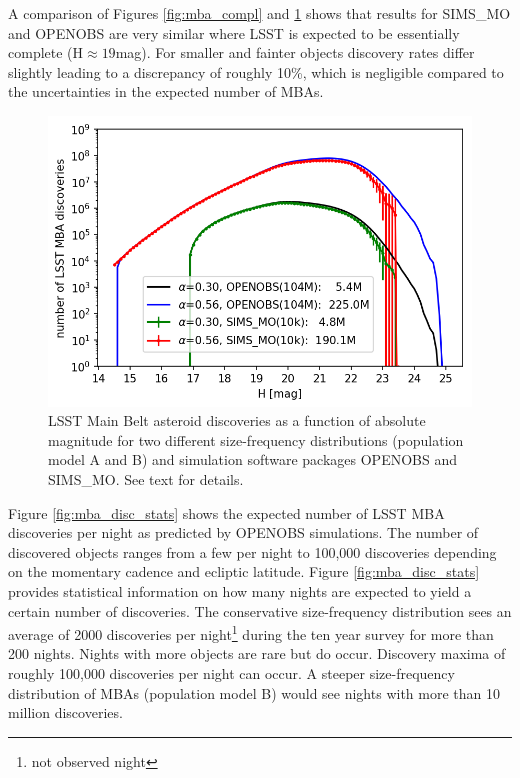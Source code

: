 A comparison of Figures \ref{fig:mba_compl} and \ref{fig:mba_disc} shows that results for SIMS\_MO and OPENOBS are very similar where \gls{LSST} is expected to be essentially complete (H$\approx19$mag). For smaller and fainter objects discovery rates differ slightly leading to a discrepancy of roughly 10\%, which is negligible compared to the uncertainties in the expected number of MBAs. 
%
\begin{figure}[tb!]
\begin{center}
\includegraphics[scale=0.9]{figs/mba_disc3.png}
\end{center}
\caption{LSST Main Belt asteroid discoveries as a function of absolute magnitude for two different size-frequency distributions (population model A and \gls{B}) and simulation software packages OPENOBS and SIMS\_MO. See text for details.}
\label{fig:mba_disc}       %
\end{figure}
%
Figure \ref{fig:mba_disc_stats} shows the expected number of \gls{LSST} \gls{MBA} discoveries per night as predicted by OPENOBS simulations. The number of discovered objects ranges from a few per night to 100,000 discoveries depending on the momentary cadence and ecliptic latitude. Figure \ref{fig:mba_disc_stats} provides statistical information on how many nights are expected to yield a certain number of discoveries. The conservative size-frequency distribution sees an average of 2000 discoveries per night\footnote{not observed night} during the ten year survey for more than 200 nights. Nights with more objects are rare but do occur. Discovery maxima of roughly 100,000 discoveries per night can occur. A steeper size-frequency distribution of MBAs (population model \gls{B}) would see nights with more than 10 million discoveries. 

